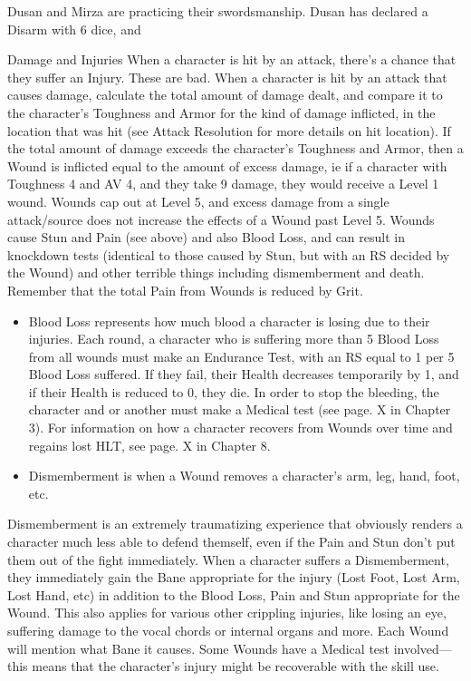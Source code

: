 \documentclass[oneside,11pt,english]{book}
\begin{document}
 

Dusan and Mirza are practicing their swordsmanship. Dusan has declared a Disarm with 6 dice, and 

 

Damage and Injuries 
When a character is hit by an attack, there's a chance that they suffer an Injury. These are bad. 
When a character is hit by an attack that causes damage, calculate the total amount of damage dealt, and 
compare it to the character's Toughness and Armor for the kind of damage inflicted, in the location that 
was hit (see Attack Resolution for more details on hit location). If the total amount of damage exceeds the 
character's Toughness and Armor, then a Wound is inflicted equal to the amount of excess damage, ie if a 
character with Toughness 4 and AV 4, and they take 9 damage, they would receive a Level 1 wound. 
Wounds cap out at Level 5, and excess damage from a single attack/source does not increase the effects 
of a Wound past Level 5. 
Wounds cause Stun and Pain (see above) and also Blood Loss, and can result in knockdown tests 
(identical to those caused by Stun, but with an RS decided by the Wound) and other terrible things 
including dismemberment and death. 
Remember that the total Pain from Wounds is reduced by Grit. 

 
\begin{itemize}
\item Blood Loss represents how much blood a character is losing due to their injuries. Each round, a 
character who is suffering more than 5 Blood Loss from all wounds must make an Endurance 
Test, with an RS equal to 1 per 5 Blood Loss suffered. If they fail, their Health decreases 
temporarily by 1, and if their Health is reduced to 0, they die. In order to stop the bleeding, the 
character and or another must make a Medical test (see page. X in Chapter 3). For information on 
how a character recovers from Wounds over time and regains lost HLT, see page. X in Chapter 8. 
 
\item Dismemberment is when a Wound removes a character's arm, leg, hand, foot, etc. 
\end{itemize}

 Dismemberment is an extremely traumatizing experience that obviously renders a 
character much less able to defend themself, even if the Pain and Stun don't put them out of the 
fight immediately. When a character suffers a Dismemberment, they immediately gain the Bane 
appropriate for the injury (Lost Foot, Lost Arm, Lost Hand, etc) in addition to the Blood Loss, 
Pain and Stun appropriate for the Wound. This also applies for various other crippling injuries, 
like losing an eye, suffering damage to the vocal chords or internal organs and more. Each 
Wound will mention what Bane it causes. Some Wounds have a Medical test involved—this 
means that the character's injury might be recoverable with the skill use. 
\end{document}
